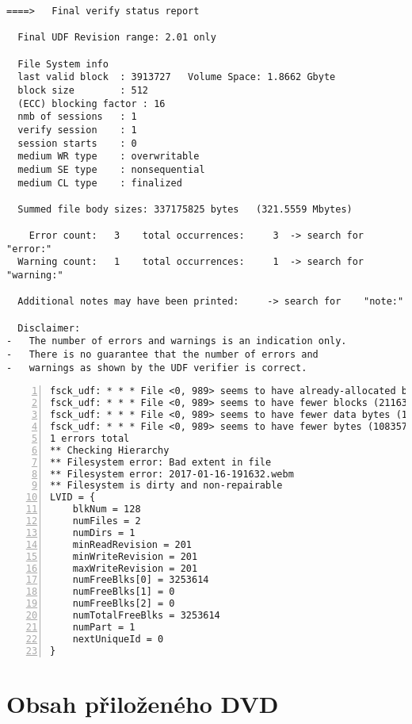 \begin{lstlisting}
====>   Final verify status report

  Final UDF Revision range: 2.01 only

  File System info
  last valid block  : 3913727   Volume Space: 1.8662 Gbyte
  block size        : 512
  (ECC) blocking factor : 16
  nmb of sessions   : 1
  verify session    : 1
  session starts    : 0       
  medium WR type    : overwritable
  medium SE type    : nonsequential
  medium CL type    : finalized

  Summed file body sizes: 337175825 bytes   (321.5559 Mbytes)

    Error count:   3    total occurrences:     3  -> search for   "error:"
  Warning count:   1    total occurrences:     1  -> search for "warning:"

  Additional notes may have been printed:     -> search for    "note:"

  Disclaimer:
-   The number of errors and warnings is an indication only.
-   There is no guarantee that the number of errors and
-   warnings as shown by the UDF verifier is correct.
\end{lstlisting}
\pagebreak
\begin{lstlisting}[frame=single,caption={Výsledek kontroly poškozeného média programem \texttt{fsck\_udf}},label=lst:fsck-udf-mac,basicstyle=\ttfamily\scriptsize, keywordstyle=\color{black}\bfseries\underbar,nolol,numbers=left,texcl=false]
fsck_udf: * * * File <0, 989> seems to have already-allocated blocks! * * *
fsck_udf: * * * File <0, 989> seems to have fewer blocks (2116354) than expected (19202) * * *
fsck_udf: * * * File <0, 989> seems to have fewer data bytes (1083573248) than expected (9830400) * * *
fsck_udf: * * * File <0, 989> seems to have fewer bytes (1083573248) than expected (9830400) * * *
1 errors total
** Checking Hierarchy
** Filesystem error: Bad extent in file
** Filesystem error: 2017-01-16-191632.webm
** Filesystem is dirty and non-repairable
LVID = {
    blkNum = 128
    numFiles = 2
    numDirs = 1
    minReadRevision = 201
    minWriteRevision = 201
    maxWriteRevision = 201
    numFreeBlks[0] = 3253614
    numFreeBlks[1] = 0
    numFreeBlks[2] = 0
    numTotalFreeBlks = 3253614
    numPart = 1
    nextUniqueId = 0
}
\end{lstlisting}

\chapter{Obsah přiloženého DVD}

